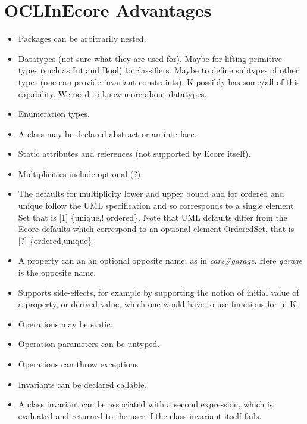 
\section{OCLInEcore Advantages}
\label{sec:oclinecorepros}

\begin{itemize}
  \item Packages can be arbitrarily nested.
  \item Datatypes (not sure what they are used for). Maybe for lifting primitive
    types (such as Int and Bool) to classifiers. Maybe to define subtypes
    of other types (one can provide invariant constraints). K possibly has some/all 
    of this capability. We need to know more about datatypes.
  \item Enumeration types.
  \item A class may be declared abstract or an interface.
  \item Static attributes and references (not supported by Ecore 
    itself).
  \item Multiplicities include optional (?).
  \item The defaults for multiplicity lower and upper bound and for 
    ordered and unique follow the UML specification and so 
    corresponds to a single element Set that is [1] \{unique,!
    ordered\}. Note that UML defaults differ from the Ecore 
    defaults which correspond to an optional element OrderedSet, 
    that is [?] \{ordered,unique\}.
  \item A property can an an optional opposite name, as in
  {\em cars\#garage}. Here {\em garage} is the opposite name.
  \item Supports side-effects, for example by supporting the notion
    of initial value of a property, or derived value, which one 
    would have to use functions for in K.
  \item Operations may be static.
  \item Operation parameters can be untyped.
  \item Operations can throw exceptions
  \item Invariants can be declared callable.
  \item A class invariant can be associated with a second
    expression, which is evaluated and returned to the user
    if the class invariant itself fails.
\end{itemize}